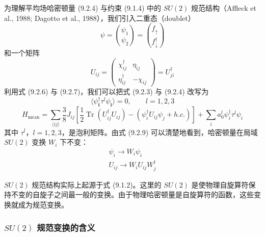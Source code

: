 为理解平均场哈密顿量 (9.2.4) 与约束 (9.1.4) 中的 $SU(2)$ 规范结构（Affleck et al., 1988; Dagotto et al., 1988），我们引入二重态（doublet）
\begin{equation*}
\psi=\binom{\psi_1}{\psi_2}=\binom{f_{\uparrow}}{f^{\dagger}_{\downarrow}}
\tag{9.2.6}
\end{equation*}
和一个矩阵
\begin{equation*}
U_{ij}=\begin{pmatrix}\chi^{\dagger}_{ij} & \eta_{ij}\\ \eta^{\dagger}_{ij} & -\chi_{ij}\end{pmatrix}=U^{\dagger}_{ji}
\tag{9.2.7}
\end{equation*}
利用式 (9.2.6) 与 (9.2.7)，我们可以把式 (9.2.3) 与 (9.2.4) 改写为
\begin{equation*}
\langle\psi^{\dagger}_{\pmb{i}}\tau^l\psi_{\pmb{i}}\rangle=0,\qquad l=1,2,3
\tag{9.2.8}
\end{equation*}
\begin{equation*}
H_{\text{mean}}=\sum_{\langle ij\rangle}\frac{3}{8}J_{ij}\left[\frac{1}{2}\operatorname{Tr}(U^{\dagger}_{ij}U_{ij})-(\psi^{\dagger}_iU_{ij}\psi_j+h.c.)\right]+\sum_i a^l_0\psi^{\dagger}_i\tau^l\psi_i
\tag{9.2.9}
\end{equation*}
其中 $\tau^l$，$l=1,2,3$，是泡利矩阵。由式 (9.2.9) 可以清楚地看到，哈密顿量在局域 $SU(2)$ 变换 $W_i$ 下不变：
\begin{equation*}
\begin{array}{c}
\psi_i\rightarrow W_i\psi_i\\
U_{ij}\rightarrow W_iU_{ij}W^{\dagger}_j
\end{array}
\tag{9.2.10}
\end{equation*}

$SU(2)$ 规范结构实际上起源于式 (9.1.2)。这里的 $SU(2)$ 是使物理自旋算符保持不变的自旋子之间最一般的变换。由于物理哈密顿量是自旋算符的函数，这些变换就成为规范变换。

\subsubsection{$SU(2)$ 规范变换的含义}

